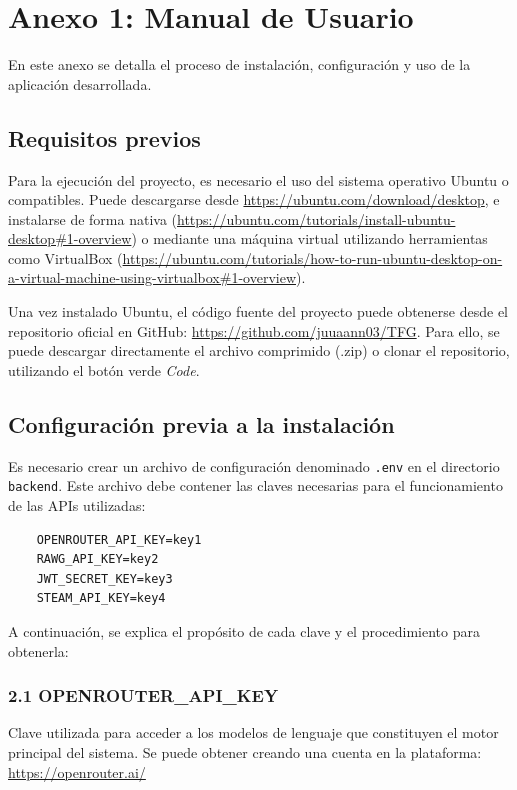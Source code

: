 \chapter*{Anexo 1: Manual de Usuario}

En este anexo se detalla el proceso de instalación, configuración y uso de la aplicación desarrollada.

\section*{Requisitos previos}

Para la ejecución del proyecto, es necesario el uso del sistema operativo Ubuntu o compatibles. Puede descargarse desde \url{https://ubuntu.com/download/desktop}, e instalarse de forma nativa (\url{https://ubuntu.com/tutorials/install-ubuntu-desktop#1-overview}) o mediante una máquina virtual utilizando herramientas como VirtualBox (\url{https://ubuntu.com/tutorials/how-to-run-ubuntu-desktop-on-a-virtual-machine-using-virtualbox#1-overview}).

Una vez instalado Ubuntu, el código fuente del proyecto puede obtenerse desde el repositorio oficial en GitHub: \url{https://github.com/juuaann03/TFG}. Para ello, se puede descargar directamente el archivo comprimido (.zip) o clonar el repositorio, utilizando el botón verde \textit{Code}.

\newpage
\section*{Configuración previa a la instalación}

Es necesario crear un archivo de configuración denominado \texttt{.env} en el directorio \texttt{backend}. Este archivo debe contener las claves necesarias para el funcionamiento de las APIs utilizadas:

\begin{verbatim}
	OPENROUTER_API_KEY=key1  
	RAWG_API_KEY=key2  
	JWT_SECRET_KEY=key3  
	STEAM_API_KEY=key4
\end{verbatim}

A continuación, se explica el propósito de cada clave y el procedimiento para obtenerla:

\subsection*{2.1 OPENROUTER\_API\_KEY}
Clave utilizada para acceder a los modelos de lenguaje que constituyen el motor principal del sistema. Se puede obtener creando una cuenta en la plataforma:  
\url{https://openrouter.ai/}

